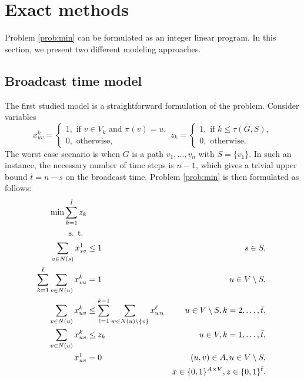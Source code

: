\section{Exact methods}

Problem \ref{prob:min} can be formulated as an integer linear program. %
In this section, we present two different modeling approaches. 

\subsection{Broadcast time model}
The first studied model is a straightforward formulation of the problem.
Consider variables 
$$ x_{uv}^k=
\begin{cases} 
1, \text{ if } v\in V_k \text{ and } \pi(v)=u,\\ 
0, \text{ otherwise},
\end{cases}
z_{k}=\begin{cases}
1, \text{ if } k\leq\tau(G,S),\\
0, \text{ otherwise}.
\end{cases}
$$
The worst case scenario is when $G$ is a path $v_1,\dots,v_n$ with $S=\{v_1\}$. 
In such an instance, the necessary number of time steps is $n-1$, which gives a trivial upper bound $\bar{t}=n-s$ on the broadcast time.
Problem \ref{prob:min} is then formulated as follows: 
\begin{subequations}\label{mod:basic}
\begin{align}
\label{mod:basic:obj} \min \sum\limits_{k=1}^{\bar{t}}z_k \\ 
\notag \text{s. t. } \\
\label{mod:basic:onefromroot} \sum_{v \in N(s)}x^1_{sv} & \leq 1 & s\in S,\\
\label{mod:basic:singlein} \sum\limits_{k=1}^{\bar{t}}\sum\limits_{v\in N(u)}x_{vu}^k & = 1 & u\in V \setminus S,\\
\label{mod:basic:tIncreases} \sum\limits_{v\in N(u)}x_{uv}^k &\leq\sum\limits_{\ell=1}^{k-1}\sum\limits_{w\in N(u)\setminus\{v\}} x_{wu}^{\ell}  & u\in V\setminus S, k=2,\dots,\bar{t},\\
\label{mod:basic:tcrel} \sum\limits_{v\in N(u)}x_{uv}^k & \leq z_k &  u\in V,k=1,\dots,\bar{t},\\
\label{mod:basic:positiveCost}x_{uv}^1 & = 0 & (u,v)\in A, u \in V\setminus S,\\
\label{mod:basic:dim}&&x \in \{0,1\}^{A\times V},z\in\{0,1\}^{\bar{t}}.
\end{align}~
\end{subequations}
